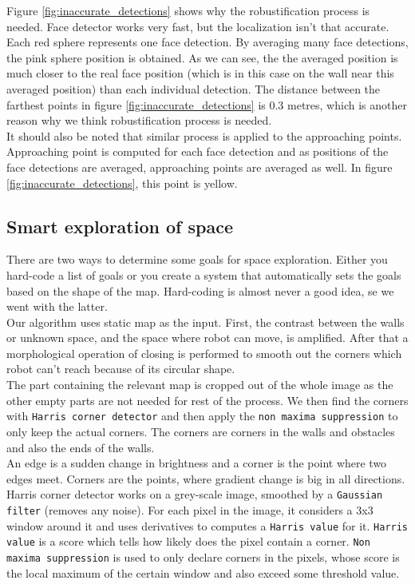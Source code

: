 \documentclass[12pt,a4paper]{article}
\begin{document}
	Figure \ref{fig:inaccurate_detections} shows why the robustification process is needed. Face detector works very fast, but the localization isn't that accurate. Each red sphere represents one face detection. By averaging many face detections, the pink sphere position is obtained. As we can see, the the averaged position is much closer to the real face position (which is in this case on the wall near this averaged position) than each individual detection. The distance between the farthest points in figure \ref{fig:inaccurate_detections} is 0.3 metres, which is another reason why we think robustification process is needed. \\
	
	It should also be noted that similar process is applied to the approaching points. Approaching point is computed for each face detection and as positions of the face detections are averaged, approaching points are averaged as well. In figure \ref{fig:inaccurate_detections}, this point is yellow. \\
		
	\subsection{Smart exploration of space} \label{smart_exploration}
	There are two ways to determine some goals for space exploration. Either you hard-code a list of goals or you create a system that automatically sets the goals based on the shape of the map. Hard-coding is almost never a good idea, se we went with the latter. \\

	Our algorithm uses static map as the input. First, the contrast between the walls or unknown space, and the space where robot can move, is amplified. After that a morphological operation of closing is performed to smooth out the corners which robot can't reach because of its circular shape. \\
	
	The part containing the relevant map is cropped out of the whole image as the other empty parts are not needed for rest of the process. We then find the corners with \texttt{Harris corner detector} and then apply the \texttt{non maxima suppression} to only keep the actual corners. The corners are corners in the walls and obstacles and also the ends of the walls. \\
	
	An edge is a sudden change in brightness and a corner is the point where two edges meet. Corners are the points, where gradient change is big in all directions. Harris corner detector works on a grey-scale image, smoothed by a \texttt{Gaussian filter} (removes any noise). For each pixel in the image, it considers a 3x3 window around it and uses derivatives to computes a \texttt{Harris value} for it. \texttt{Harris value} is a score which tells how likely does the pixel contain a corner. \texttt{Non maxima suppression} is used to only declare corners in the pixels, whose score is the local maximum of the certain window and also exceed some threshold value. \\
\end{document}
